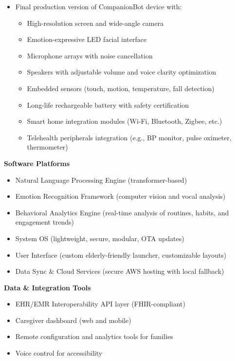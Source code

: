 \documentclass[
  letterpaper,
  DIV=11,
  numbers=noendperiod]{scrartcl}
\providecommand{\tightlist}{%
  \setlength{\itemsep}{0pt}\setlength{\parskip}{0pt}}\usepackage{longtable,booktabs,array}
\begin{document}
\begin{itemize}
\tightlist
\item
  Final production version of CompanionBot device with:

  \begin{itemize}
  \tightlist
  \item
    High-resolution screen and wide-angle camera
  \item
    Emotion-expressive LED facial interface
  \item
    Microphone arrays with noise cancellation
  \item
    Speakers with adjustable volume and voice clarity optimization
  \item
    Embedded sensors (touch, motion, temperature, fall detection)
  \item
    Long-life rechargeable battery with safety certification
  \item
    Smart home integration modules (Wi-Fi, Bluetooth, Zigbee, etc.)
  \item
    Telehealth peripherals integration (e.g., BP monitor, pulse
    oximeter, thermometer)
  \end{itemize}
\end{itemize}

\textbf{Software Platforms}

\begin{itemize}
\tightlist
\item
  Natural Language Processing Engine (transformer-based)
\item
  Emotion Recognition Framework (computer vision and vocal analysis)
\item
  Behavioral Analytics Engine (real-time analysis of routines, habits,
  and engagement trends)
\item
  System OS (lightweight, secure, modular, OTA updates)
\item
  User Interface (custom elderly-friendly launcher, customizable
  layouts)
\item
  Data Sync \& Cloud Services (secure AWS hosting with local fallback)
\end{itemize}

\textbf{Data \& Integration Tools}

\begin{itemize}
\tightlist
\item
  EHR/EMR Interoperability API layer (FHIR-compliant)
\item
  Caregiver dashboard (web and mobile)
\item
  Remote configuration and analytics tools for families
\item
  Voice control for accessibility
\end{itemize}
\end{document}
